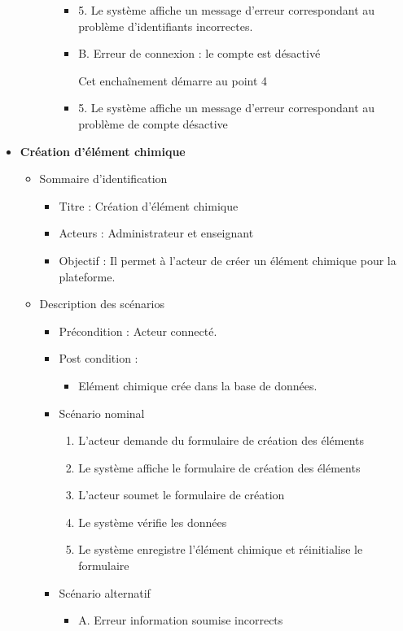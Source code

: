 \begin{itemize}
\begin{itemize}
\begin{itemize}
\begin{itemize}
				                  \item 5. Le système affiche un message d’erreur correspondant au problème d’identifiants incorrectes.
				                  \item B. Erreur de connexion : le compte est désactivé

				                        Cet enchaînement démarre au point 4

				                  \item 5. Le système affiche un message d’erreur correspondant au problème de compte désactive
			                  \end{itemize}
		            \end{itemize}
	      \end{itemize}
	\item \textbf{Création d’élément chimique }
	      \begin{itemize}
		      \item Sommaire d’identification
		            \begin{itemize}
			            \item Titre : Création d’élément chimique
			            \item Acteurs : Administrateur et enseignant
			            \item Objectif : Il permet à l’acteur de créer un élément chimique pour la plateforme.
		            \end{itemize}
		      \item Description des scénarios
		            \begin{itemize}
			            \item Précondition : Acteur connecté.
			            \item Post condition :
			                  \begin{itemize}
				                  \item Elément chimique crée dans la base de données.
			                  \end{itemize}
			            \item Scénario nominal
			                  \begin{enumerate}
				                  \item L’acteur demande du formulaire de création des éléments
				                  \item Le système affiche le formulaire de création des éléments
				                  \item L’acteur soumet le formulaire de création
				                  \item Le système vérifie les données
				                  \item Le système enregistre l’élément chimique et réinitialise le formulaire
			                  \end{enumerate}
			            \item Scénario alternatif
			                  \begin{itemize}
				                  \item A. Erreur information soumise incorrects


\end{itemize}
\end{itemize}
\end{itemize}
\end{itemize}
